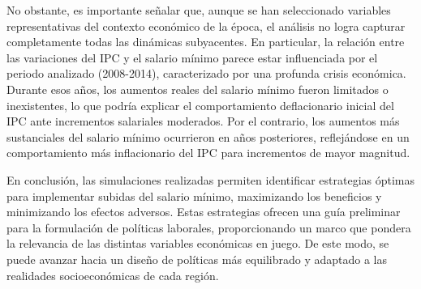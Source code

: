 \documentclass[11pt]{article}
\begin{document}
No obstante, es importante señalar que, aunque se han seleccionado
variables representativas del contexto económico de la época, el
análisis no logra capturar completamente todas las dinámicas
subyacentes. En particular, la relación entre las variaciones del IPC y
el salario mínimo parece estar influenciada por el periodo analizado
(2008-2014), caracterizado por una profunda crisis económica. Durante
esos años, los aumentos reales del salario mínimo fueron limitados o
inexistentes, lo que podría explicar el comportamiento deflacionario
inicial del IPC ante incrementos salariales moderados. Por el contrario,
los aumentos más sustanciales del salario mínimo ocurrieron en años
posteriores, reflejándose en un comportamiento más inflacionario del IPC
para incrementos de mayor magnitud.

En conclusión, las simulaciones realizadas permiten identificar
estrategias óptimas para implementar subidas del salario mínimo,
maximizando los beneficios y minimizando los efectos adversos. Estas
estrategias ofrecen una guía preliminar para la formulación de políticas
laborales, proporcionando un marco que pondera la relevancia de las
distintas variables económicas en juego. De este modo, se puede avanzar
hacia un diseño de políticas más equilibrado y adaptado a las realidades
socioeconómicas de cada región.

    


    
    
    
\end{document}
